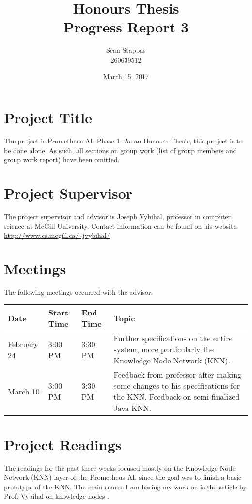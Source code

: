 \documentclass[]{article}
\title{\textbf{Honours Thesis \\ Progress Report 3}}
\author{Sean Stappas \\ 260639512}
\date{March 15, 2017}
\begin{document}
	\maketitle
	
	\section{Project Title}
	
	The project is Prometheus AI: Phase 1. As an Honours Thesis, this project is to be done alone. As such, all sections on group work (list of group members and group work report) have been omitted.
	
	\section{Project Supervisor}
	
	The project supervisor and advisor is Joseph Vybihal, professor in computer science at McGill University. Contact information can be found on his website: \url{http://www.cs.mcgill.ca/~jvybihal/}
	
	\section{Meetings}
	
	The following meetings occurred with the advisor:
	
	\begin{center}
		\begin{tabular}{l l l p{9.5cm}}
			\textbf{Date} & \textbf{Start Time} & \textbf{End Time} & \textbf{Topic} \\ \hline
			February 24 & 3:00 PM & 3:30 PM & Further specifications on the entire system, more particularly the Knowledge Node Network (KNN). \\ \hline
			March 10 & 3:00 PM & 3:30 PM & Feedback from professor after making some changes to his specifications for the KNN. Feedback on semi-finalized Java KNN. \\ \hline
		\end{tabular}
	\end{center}
	
	\section{Project Readings}
	
	The readings for the past three weeks focused mostly on the Knowledge Node Network (KNN) layer of the Prometheus AI, since the goal was to finish a basic prototype of the KNN. The main source I am basing my work on is the article by Prof. Vybihal on knowledge nodes \cite{vybihal-knowledge}.
	
\end{document}
